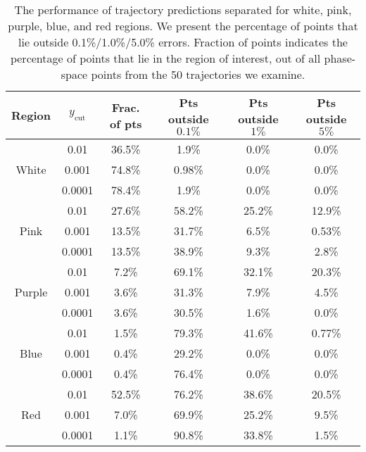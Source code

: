 \documentclass[main.tex]{subfiles}
\begin{document}
\begin{table}
    \centering
    \small
    \begin{tabular}{|c|c|c|c|c|c|}
        \hline
        Region & $y_{\mathrm{cut}}$ & Frac. of pts & Pts outside $0.1\%$ & Pts outside $1\%$ & Pts outside $5\%$ \\
        \hline
        \multirow{3}{*}{White} & 0.01   & 36.5\% & 1.9\% & 0.0\% & 0.0\% \\
        \cline{2-6}
                               & 0.001  & 74.8\% & 0.98\% & 0.0\% & 0.0\% \\
        \cline{2-6}
                               & 0.0001 & 78.4\% & 1.9\% & 0.0\%  & 0.0\% \\
        \hline
        \hline
        \multirow{3}{*}{Pink}  & 0.01   & 27.6\% & 58.2\% & 25.2\% & 12.9\% \\
        \cline{2-6}
                               & 0.001  & 13.5\% & 31.7\% & 6.5\% & 0.53\% \\
        \cline{2-6}
                               & 0.0001 & 13.5\% & 38.9\% & 9.3\% & 2.8\% \\
        \hline
        \hline
        \multirow{3}{*}{Purple}& 0.01   & 7.2\% & 69.1\% & 32.1\% & 20.3\% \\
        \cline{2-6}
                               & 0.001  & 3.6\% & 31.3\% & 7.9\% & 4.5\% \\
        \cline{2-6}
                               & 0.0001 & 3.6\% & 30.5\% & 1.6\% & 0.0\% \\
        \hline
        \hline
        \multirow{3}{*}{Blue}  & 0.01   & 1.5\% & 79.3\% & 41.6\% & 0.77\% \\
        \cline{2-6}
                               & 0.001  & 0.4\% & 29.2\% & 0.0\% & 0.0\% \\
        \cline{2-6}
                               & 0.0001 & 0.4\% & 76.4\% & 0.0\% & 0.0\% \\
        \hline
        \hline
        \multirow{3}{*}{Red}   & 0.01   & 52.5\% & 76.2\% & 38.6\% & 20.5\% \\
        \cline{2-6}
                               & 0.001  & 7.0\%  & 69.9\% & 25.2\% & 9.5\% \\
        \cline{2-6}
                               & 0.0001 & 1.1\%  & 90.8\% & 33.8\% & 1.5\% \\
        \hline
    \end{tabular}
    \caption{The performance of trajectory predictions separated for white, pink, purple, blue, and red regions.
    We present the percentage of points that lie outside 0.1\%/1.0\%/5.0\% errors.
    Fraction of points indicates the percentage of points that lie in the region of interest, out of all phase-space points from the 50 trajectories we examine.
    }
    \label{table:trajectory_predictions}
\end{table}
\end{document}
